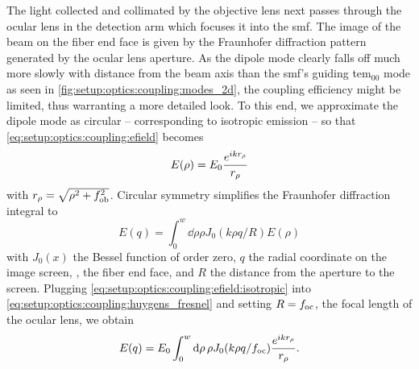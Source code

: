The light collected and collimated by the objective lens next passes through the ocular lens in the detection arm which focuses it into the \gls{smf}.
The image of the beam on the fiber end face is given by the Fraunhofer diffraction pattern generated by the ocular lens aperture.
As the dipole mode clearly falls off much more slowly with distance from the beam axis than the \gls{smf}'s guiding \acrshort{tem}$_{00}$ mode as seen in \cref{fig:setup:optics:coupling:modes_2d}, the coupling efficiency might be limited, thus warranting a more detailed look.
To this end, we approximate the dipole mode as circular -- corresponding to isotropic emission -- so that \cref{eq:setup:optics:coupling:efield} becomes
\begin{equation}\label{eq:setup:optics:coupling:efield:isotropic}
    E(\rho) = E_0\frac{e^{i k r_\rho}}{r_\rho}
\end{equation}
with $r_\rho = \sqrt{\rho^2 + f_{\mathrm{ob}}^2}$.
Circular symmetry simplifies the Fraunhofer diffraction integral to~\cite{Hecht2017}
\begin{equation}\label{eq:setup:optics:coupling:huygens_fresnel}
    E(q) = \int_{0}^{w}\dd{\rho} \rho J_0(k\rho q/R) E(\rho)
\end{equation}
with $J_0(x)$ the Bessel function of order zero, $q$ the radial coordinate on the image screen, \ie, the fiber end face, and $R$ the distance from the aperture to the screen.
Plugging \cref{eq:setup:optics:coupling:efield:isotropic} into \cref{eq:setup:optics:coupling:huygens_fresnel} and setting $R=f_{\mathrm{oc}}$, the focal length of the ocular lens, we obtain
\begin{equation}\label{eq:setup:optics:coupling:huygens_fresnel:evaluated}
    E(q) = E_0\int_{0}^{w}\dd{\rho}\rho J_0(k\rho q/f_{\mathrm{oc}})\frac{e^{i k r_\rho}}{r_\rho}.
\end{equation}

